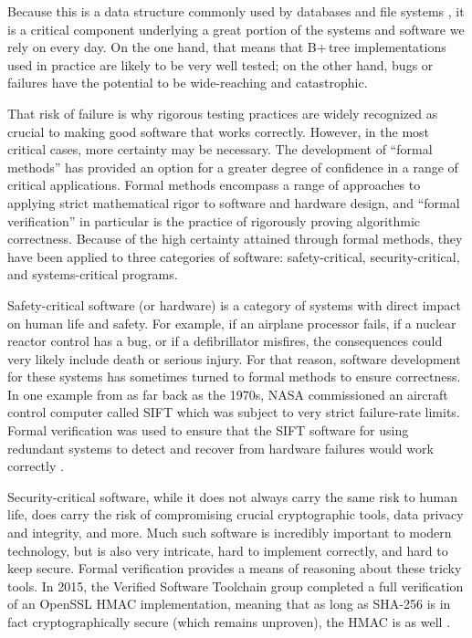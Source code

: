 \documentclass[a4paper,12pt]{article}
\begin{document}
Because this is a data structure commonly used by databases and file systems \cite{elmasri_navathe_2011}, it is a critical component underlying a great portion of the systems and software we rely on every day. On the one hand, that means that B+\,tree implementations used in practice are likely to be very well tested; on the other hand, bugs or failures have the potential to be wide-reaching and catastrophic.

That risk of failure is why rigorous testing practices are widely recognized as crucial to making good software that works correctly. However, in the most critical cases, more certainty may be necessary. The development of “formal methods” has provided an option for a greater degree of confidence in a range of critical applications. Formal methods encompass a range of approaches to applying strict mathematical rigor to software and hardware design, and “formal verification” in particular is the practice of rigorously proving algorithmic correctness. Because of the high certainty attained through formal methods, they have been applied to three categories of software: safety-critical, security-critical, and systems-critical programs.

Safety-critical software (or hardware) is a category of systems with direct impact on human life and safety. For example, if an airplane processor fails, if a nuclear reactor control has a bug, or if a defibrillator misfires, the consequences could very likely include death or serious injury. For that reason, software development for these systems has sometimes turned to formal methods to ensure correctness. In one example from as far back as the 1970s, NASA commissioned an aircraft control computer called SIFT which was subject to very strict failure-rate limits. Formal verification was used to ensure that the SIFT software for using redundant systems to detect and recover from hardware failures would work correctly \cite{225554}.

Security-critical software, while it does not always carry the same risk to human life, does carry the risk of compromising crucial cryptographic tools, data privacy and integrity, and more. Much such software is incredibly important to modern technology, but is also very intricate, hard to implement correctly, and hard to keep secure. Formal verification provides a means of reasoning about these tricky tools. In 2015, the Verified Software Toolchain group completed a full verification of an OpenSSL HMAC implementation, meaning that as long as SHA-256 is in fact cryptographically secure (which remains unproven), the HMAC is as well \cite{190894}.
\end{document}
